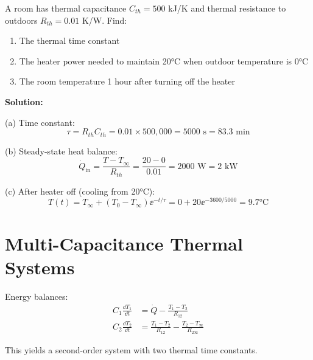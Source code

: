 \begin{examplebox}[title=Example 1.10: Room Heating]
A room has thermal capacitance $C_{th} = 500$ kJ/K and thermal resistance to outdoors $R_{th} = 0.01$ K/W. Find:
\begin{enumerate}[label=(\alph*)]
    \item The thermal time constant
    \item The heater power needed to maintain 20°C when outdoor temperature is 0°C
    \item The room temperature 1 hour after turning off the heater
\end{enumerate}

\textbf{Solution:}

(a) Time constant:
\begin{equation}
\tau = R_{th}C_{th} = 0.01 \times 500{,}000 = 5000 \text{ s} = 83.3 \text{ min}
\end{equation}

(b) Steady-state heat balance:
\begin{equation}
\dot{Q}_{\text{in}} = \frac{T - T_\infty}{R_{th}} = \frac{20 - 0}{0.01} = 2000 \text{ W} = 2 \text{ kW}
\end{equation}

(c) After heater off (cooling from 20°C):
\begin{equation}
T(t) = T_\infty + (T_0 - T_\infty)\ee^{-t/\tau} = 0 + 20\ee^{-3600/5000} = 9.7°\text{C}
\end{equation}
\end{examplebox}

\section{Multi-Capacitance Thermal Systems}
\label{sec:multi_thermal}



Energy balances:
\begin{align}
C_1\frac{\dd T_1}{\dd t} &= \dot{Q} - \frac{T_1 - T_2}{R_{12}} \\
C_2\frac{\dd T_2}{\dd t} &= \frac{T_1 - T_2}{R_{12}} - \frac{T_2 - T_\infty}{R_{2\infty}}
\end{align}

This yields a second-order system with two thermal time constants.

